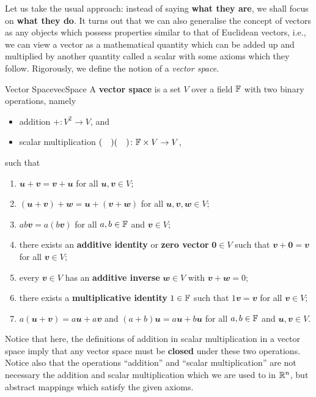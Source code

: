\documentclass[math]{amznotes}
\theoremstyle{remark}
\newcommand{\zero}{\mathbf{0}}
\begin{document}
Let us take the usual approach: instead of saying \textbf{what they are}, we shall focus on \textbf{what they do}. It turns out that we can also generalise the concept of vectors as any objects which possess properties similar to that of Euclidean vectors, i.e., we can view a vector as a mathematical quantity which can be added up and multiplied by another quantity called a scalar with some axioms which they follow. Rigorously, we define the notion of a \textit{vector space}.
\begin{dfnbox}{Vector Space}{vecSpace}
    A {\color{red} \textbf{vector space}} is a set $V$ over a field $\mathbb{F}$ with two binary operations, namely 
    \begin{itemize}
        \item addition $+ \colon V^2 \to V$, and
        \item scalar multiplication $(\quad)(\quad) \colon \mathbb{F} \times V \to V$,
    \end{itemize}
    such that
    \begin{enumerate}
        \item $\mathbfit{u + v = v + u}$ for all $\mathbfit{u}, \mathbfit{v} \in V$;
        \item $\mathbfit{(u + v) + w = u + (v + w)}$ for all $\mathbfit{u, v, w} \in V$;
        \item $ab\mathbfit{v} = a(b\mathbfit{v})$ for all $a, b \in \mathbb{F}$ and $\mathbfit{v} \in V$;
        \item there exists an {\color{red} \textbf{additive identity}} or {\color{red} \textbf{zero vector}} $\zero \in V$ such that $\mathbfit{v} + \zero = \mathbfit{v}$ for all $\mathbfit{v} \in V$;
        \item every $\mathbfit{v} \in V$ has an {\color{red} \textbf{additive inverse}} $\mathbfit{w} \in V$ with $\mathbfit{v + w} = 0$;
        \item there exists a {\color{red} \textbf{multiplicative identity}} $1 \in \mathbb{F}$ such that $1\mathbfit{v} = \mathbfit{v}$ for all $\mathbfit{v} \in V$;
        \item $a\mathbfit{(u + v)} = a\mathbfit{u} + a\mathbfit{v}$ and $(a + b)\mathbfit{u} = a\mathbfit{u} + b\mathbfit{u}$ for all $a, b \in \mathbb{F}$ and $\mathbfit{u, v} \in V$.
    \end{enumerate}
\end{dfnbox}
Notice that here, the definitions of addition in scalar multiplication in a vector space imply that any vector space must be \textbf{closed} under these two operations. Notice also that the operations ``addition'' and ``scalar multiplication'' are not necessary the addition and scalar multiplication which we are used to in $\mathbb{R}^n$, but abstract mappings which satisfy the given axioms.
\end{document}
